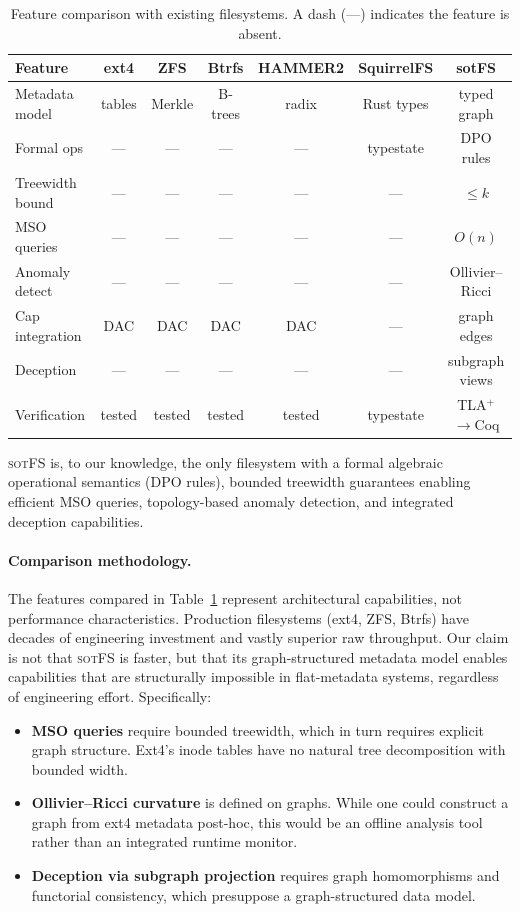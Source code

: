 \documentclass[11pt,a4paper]{article}
\theoremstyle{definition}
\theoremstyle{remark}
\newcommand{\sotfs}{\textsc{sotFS}}
\begin{document}
\begin{table}[H]
\centering
\caption{Feature comparison with existing filesystems. A dash (---)
  indicates the feature is absent.}
\label{tab:comparison}
\small
\begin{tabular}{@{}lcccccc@{}}
\toprule
\textbf{Feature} & \textbf{ext4} & \textbf{ZFS} & \textbf{Btrfs} & \textbf{HAMMER2} & \textbf{SquirrelFS} & \textbf{sotFS} \\
\midrule
Metadata model & tables & Merkle & B-trees & radix & Rust types & typed graph \\
Formal ops     & --- & --- & --- & --- & typestate & DPO rules \\
Treewidth bound & --- & --- & --- & --- & --- & $\leq k$ \\
MSO queries    & --- & --- & --- & --- & --- & $O(n)$ \\
Anomaly detect & --- & --- & --- & --- & --- & Ollivier--Ricci \\
Cap integration & DAC & DAC & DAC & DAC & --- & graph edges \\
Deception      & --- & --- & --- & --- & --- & subgraph views \\
Verification   & tested & tested & tested & tested & typestate & TLA$^+$$\to$Coq \\
\bottomrule
\end{tabular}
\end{table}

\sotfs{} is, to our knowledge, the only filesystem with a formal
algebraic operational semantics (DPO rules), bounded treewidth
guarantees enabling efficient MSO queries, topology-based anomaly
detection, and integrated deception capabilities.

\paragraph{Comparison methodology.}
The features compared in Table~\ref{tab:comparison} represent
architectural capabilities, not performance characteristics.
Production filesystems (ext4, ZFS, Btrfs) have decades of
engineering investment and vastly superior raw throughput. Our
claim is not that \sotfs{} is faster, but that its graph-structured
metadata model enables capabilities that are structurally impossible
in flat-metadata systems, regardless of engineering effort.
Specifically:

\begin{itemize}[leftmargin=1.4em]
\item \textbf{MSO queries} require bounded treewidth, which in turn
  requires explicit graph structure. Ext4's inode tables have no
  natural tree decomposition with bounded width.

\item \textbf{Ollivier--Ricci curvature} is defined on graphs. While
  one could construct a graph from ext4 metadata post-hoc, this would
  be an offline analysis tool rather than an integrated runtime
  monitor.

\item \textbf{Deception via subgraph projection} requires graph
  homomorphisms and functorial consistency, which presuppose a
  graph-structured data model.
\end{itemize}
\end{document}
